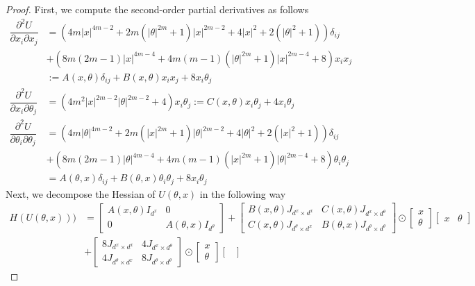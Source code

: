\documentclass[a4paper, 10pt]{article}
\theoremstyle{plain}%
\begin{document}
\begin{proof}
    First, we compute the second-order partial derivatives as follows
\begin{align*}
     \dfrac{\partial^2 U}{\partial x_i\partial x_j}&=\left(4m|x|^{4m-2}+2m(|\theta|^{2m}+1)|x|^{2m-2}+4|x|^2+2(|\theta|^2+1)\right)\delta_{ij}\\&+\left(8m(2m-1)|x|^{4m-4}+4m(m-1)(|\theta|^{2m}+1)|x|^{2m-4}+8\right)x_ix_j\\&:=A(x,\theta)\delta_{ij}+B(x,\theta)x_ix_j+8x_i\theta_j\\
    \dfrac{\partial^2 U}{\partial x_i\partial \theta_j}&=(4m^2|x|^{2m-2}|\theta|^{2m-2}+4)x_i\theta_j:=C(x,\theta)x_i\theta_j+4x_i\theta_j\\
     \dfrac{\partial^2 U}{\partial \theta_i\partial \theta_j}&=\left(4m|\theta|^{4m-2}+2m(|x|^{2m}+1)|\theta|^{2m-2}+4|\theta|^2+2(|x|^2+1)\right)\delta_{ij}\\&+\left(8m(2m-1)|\theta|^{4m-4}+4m(m-1)(|x|^{2m}+1)|\theta|^{2m-4}+8\right)\theta_i\theta_j\\&=A(\theta,x)\delta_{ij}+B(\theta,x)\theta_i\theta_j+8x_i\theta_j
\end{align*}
Next, we decompose the Hessian of $U(\theta,x)$ in the following way
\begin{align*}
    H(U(\theta,x)))&=\begin{bmatrix}
A(x,\theta) I_{d^x}& 0\\
0 & A(\theta,x) I_{d^{\theta}}
\end{bmatrix}+\begin{bmatrix}
B(x,\theta)J_{d^x\times d^x}& C(x,\theta)J_{d^x\times d^{\theta}}\\
C(x,\theta)J_{d^{\theta}\times d^x} & B(\theta,x)J_{d^{\theta}\times d^{\theta}}
\end{bmatrix}\odot\begin{bmatrix}
x\\
\theta 
\end{bmatrix} \begin{bmatrix}
x&\theta
\end{bmatrix}\\
&+\begin{bmatrix}
8J_{d^x\times d^x}& 4J_{d^x\times d^{\theta}}\\
4J_{d^{\theta}\times d^x} & 8J_{d^{\theta}\times d^{\theta}}
\end{bmatrix}\odot\begin{bmatrix}
x\\
\theta 
\end{bmatrix} \begin{bmatrix}

\end{bmatrix}
\end{align*}
\end{proof}
\end{document}

